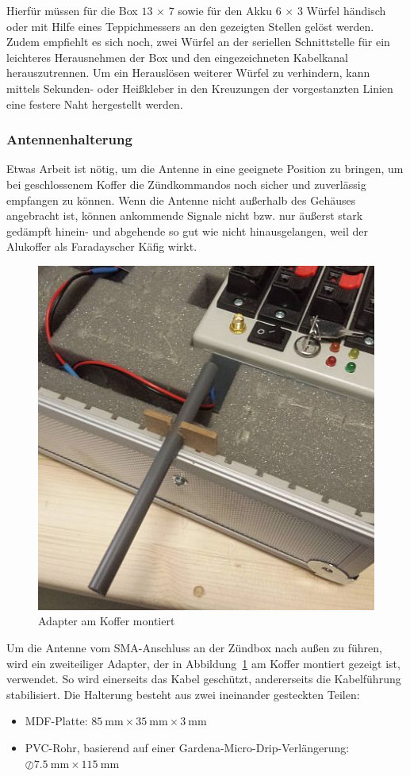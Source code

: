 \documentclass[paper=a4, parskip, numbers=noenddot, toc=listof, headsepline]{scrbook}
\begin{document}
						Hierfür müssen für die Box $13\,\times\,7$ sowie für den Akku $6\,\times\,3$ Würfel händisch oder mit Hilfe eines Teppichmessers an den gezeigten Stellen gelöst werden. Zudem empfiehlt es sich noch, zwei Würfel an der seriellen Schnittstelle für ein leichteres Herausnehmen der Box und den eingezeichneten Kabelkanal herauszutrennen. Um ein Herauslösen weiterer Würfel zu verhindern, kann mittels Sekunden- oder Heißkleber in den Kreuzungen der vorgestanzten Linien eine festere Naht hergestellt werden.

					\subsubsection{Antennenhalterung}

						Etwas Arbeit ist nötig, um die Antenne in eine geeignete Position zu bringen, um bei geschlossenem Koffer die Zündkommandos noch sicher und zuverlässig empfangen zu können. Wenn die Antenne nicht außerhalb des Gehäuses angebracht ist, können ankommende Signale nicht bzw. nur äußerst stark gedämpft hinein- und abgehende so gut wie nicht hinausgelangen, weil der Alukoffer als Faradayscher Käfig wirkt.

						\begin{figure}
							\centering
							\includegraphics[width=.75\textwidth]{Bilder/koffer-adapter-montiert}
							\caption{Adapter am Koffer montiert}
							\label{fig:koffer-adapter-montiert}
						\end{figure}

						Um die Antenne vom SMA-Anschluss an der Zündbox nach außen zu führen, wird ein zweiteiliger Adapter, der in Abbildung~\ref{fig:koffer-adapter-montiert} am Koffer montiert gezeigt ist, verwendet. So wird einerseits das Kabel geschützt, andererseits die Kabelführung stabilisiert. Die Halterung besteht aus zwei ineinander gesteckten Teilen:
						\begin{itemize}
							\item MDF-Platte: $\SI{85}{\milli\metre} \times \SI{35}{\milli\metre} \times \SI{3}{\milli\metre}$
							\item PVC-Rohr, basierend auf einer Gardena-Micro-Drip-Verlängerung: $\oslash\SI{7,5}{\milli\metre} \times \SI{115}{\milli\metre}$
						\end{itemize}
\end{document}

